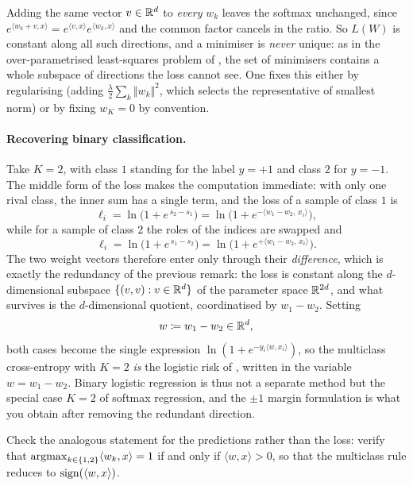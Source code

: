 \begin{remark}
Adding the same vector $v \in \mathbb{R}^d$ to \emph{every} $w_k$ leaves the softmax
unchanged, since $e^{\langle w_k + v, x\rangle} = e^{\langle v, x\rangle} e^{\langle
w_k, x\rangle}$ and the common factor cancels in the ratio. So $L(W)$ is constant
along all such directions, and a minimiser is \emph{never} unique: as in the
over-parametrised least-squares problem of , the set of
minimisers contains a whole subspace of directions the loss cannot see. One fixes this
either by regularising (adding $\frac{\lambda}{2}\sum_k \Vert w_k \Vert^2$, which
selects the representative of smallest norm) or by fixing $w_K = 0$ by convention.
\end{remark}

\paragraph{Recovering binary classification.}
Take $K = 2$, with class $1$ standing for the label $y = +1$ and class $2$ for $y =
-1$. The middle form of the loss makes the computation immediate: with only one rival
class, the inner sum has a single term, and the loss of a sample of class $1$ is
\[
\ell_i = \ln\Big( 1 + e^{\,s_2 - s_1} \Big)
= \ln\Big( 1 + e^{- \langle w_1 - w_2, \, x_i \rangle} \Big) ,
\]
while for a sample of class $2$ the roles of the indices are swapped and
\[
\ell_i = \ln\Big( 1 + e^{\,s_1 - s_2} \Big)
= \ln\Big( 1 + e^{+ \langle w_1 - w_2, \, x_i \rangle} \Big) .
\]
The two weight vectors therefore enter only through their \emph{difference}, which is
exactly the redundancy of the previous remark: the loss is constant along the
$d$-dimensional subspace $\{(v, v) : v \in \mathbb{R}^d\}$ of the parameter space $\mathbb{R}^{2d}$,
and what survives is the $d$-dimensional quotient, coordinatised by $w_1 - w_2$.
Setting
\[
w \coloneqq w_1 - w_2 \in \mathbb{R}^d ,
\]
both cases become the single expression $\ln(1 + e^{-y_i \langle w, x_i\rangle})$, so
the multiclass cross-entropy with $K = 2$ \emph{is} the logistic risk of
, written in the variable $w = w_1 - w_2$. Binary logistic
regression is thus not a separate method but the special case $K = 2$ of softmax
regression, and the $\pm 1$ margin formulation is what you obtain after removing the
redundant direction.

\begin{exercise}[$\star$]
Check the analogous statement for the predictions rather than the loss: verify that
$\operatorname*{argmax}_{k \in \{1,2\}} \langle w_k, x\rangle = 1$ if and only if $\langle w, x
\rangle > 0$, so that the multiclass rule reduces to $\mathop{ \rm sign}(\langle w, x\rangle)$.
\end{exercise}